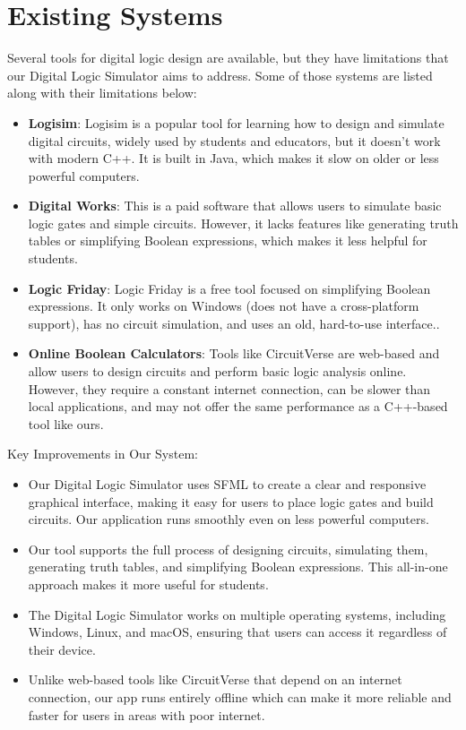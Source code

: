 \section{Existing Systems}
Several tools for digital logic design are available, but they have limitations that our Digital Logic Simulator aims to address. Some of those systems are listed along with their limitations below:

\begin{itemize}
    \item \textbf{Logisim}: Logisim is a popular tool for learning how to design and simulate digital circuits, widely used by students and educators, but it doesn't work with modern C++. It is built in Java, which makes it slow on older or less powerful computers.
    \item \textbf{Digital Works}: This is a paid software that allows users to simulate basic logic gates and simple circuits. However, it lacks features like generating truth tables or simplifying Boolean expressions, which makes it less helpful for students.
    \item \textbf{Logic Friday}: Logic Friday is a free tool focused on simplifying Boolean expressions. It only works on Windows (does not have a cross-platform support), has no circuit simulation, and uses an old, hard-to-use interface..
    \item \textbf{Online Boolean Calculators}: Tools like CircuitVerse are web-based and allow users to design circuits and perform basic logic analysis online. However, they require a constant internet connection, can be slower than local applications, and may not offer the same performance as a C++-based tool like ours.
\end{itemize}
\clearpage
Key Improvements in Our System:
\begin{itemize}
    \item Our Digital Logic Simulator uses SFML to create a clear and responsive graphical interface, making it easy for users to place logic gates and build circuits. Our application runs smoothly even on less powerful computers.
    \item Our tool supports the full process of designing circuits, simulating them, generating truth tables, and simplifying Boolean expressions. This all-in-one approach makes it more useful for students.
    \item The Digital Logic Simulator works on multiple operating systems, including Windows, Linux, and macOS, ensuring that users can access it regardless of their device.
    \item Unlike web-based tools like CircuitVerse that depend on an internet connection, our app runs entirely offline which can make it more reliable and faster for users in areas with poor internet.
\end{itemize}
\clearpage